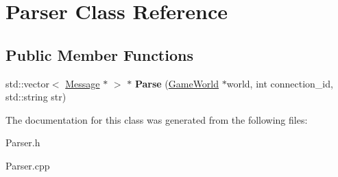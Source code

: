\hypertarget{class_parser}{}\section{Parser Class Reference}
\label{class_parser}
\subsection*{Public Member Functions}
\begin{DoxyCompactItemize}
\item 
\hypertarget{class_parser_afd1458368f2c5fe1f65ed6653e122def}{}std\+::vector$<$ \hyperlink{class_message}{Message} $\ast$ $>$ $\ast$ {\bfseries Parse} (\hyperlink{class_game_world}{Game\+World} $\ast$world, int connection\+\_\+id, std\+::string str)\label{class_parser_afd1458368f2c5fe1f65ed6653e122def}

\end{DoxyCompactItemize}


The documentation for this class was generated from the following files\+:\begin{DoxyCompactItemize}
\item 
Parser.\+h\item 
Parser.\+cpp\end{DoxyCompactItemize}
